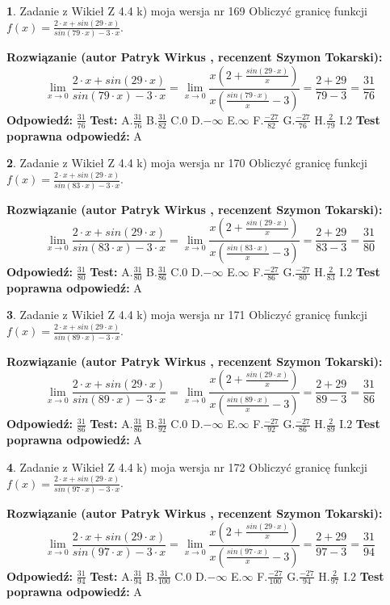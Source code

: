 \documentclass[12pt, a4paper]{article}
\theoremstyle{definition} %
\newtheorem{zad}{}
\newcommand{\zadStart}[1]{\begin{zad}#1\newline}
\newcommand{\zadStop}{\end{zad}}
\newcommand{\rozwStart}[2]{\noindent \textbf{Rozwiązanie (autor #1 , recenzent #2): }\newline}
\newcommand{\rozwStop}{\newline}
\newcommand{\odpStart}{\noindent \textbf{Odpowiedź:}\newline}
\newcommand{\odpStop}{\newline}
\newcommand{\testStart}{\noindent \textbf{Test:}\newline}
\newcommand{\testStop}{\newline}
\newcommand{\kluczStart}{\noindent \textbf{Test poprawna odpowiedź:}\newline}
\newcommand{\kluczStop}{\newline}
\begin{document}
\zadStart{Zadanie z Wikieł Z 4.4 k) moja wersja nr 169}
Obliczyć granicę funkcji $f(x)=\frac{2\cdot x +sin(29\cdot x)}{sin(79\cdot x) -3\cdot x}$.
\zadStop
\rozwStart{Patryk Wirkus}{Szymon Tokarski}
$$\lim\limits_{x\to 0}\frac{2\cdot x +sin(29\cdot x)}{sin(79\cdot x) -3\cdot x}
=\lim\limits_{x\to 0}\frac{x(2+\frac{sin(29\cdot x)}{x})}{x(\frac{sin(79\cdot x)}{x}-3)}
=\frac{2+29}{79-3} = \frac{31}{76}$$
\rozwStop
\odpStart
$\frac{31}{76}$
\odpStop
\testStart
A.$\frac{31}{76}$
B.$\frac{31}{82}$
C.$0$
D.$-\infty$
E.$\infty$
F.$\frac{-27}{82}$
G.$\frac{-27}{76}$
H.$\frac{2}{79}$
I.$2$
\testStop
\kluczStart
A
\kluczStop



\zadStart{Zadanie z Wikieł Z 4.4 k) moja wersja nr 170}
Obliczyć granicę funkcji $f(x)=\frac{2\cdot x +sin(29\cdot x)}{sin(83\cdot x) -3\cdot x}$.
\zadStop
\rozwStart{Patryk Wirkus}{Szymon Tokarski}
$$\lim\limits_{x\to 0}\frac{2\cdot x +sin(29\cdot x)}{sin(83\cdot x) -3\cdot x}
=\lim\limits_{x\to 0}\frac{x(2+\frac{sin(29\cdot x)}{x})}{x(\frac{sin(83\cdot x)}{x}-3)}
=\frac{2+29}{83-3} = \frac{31}{80}$$
\rozwStop
\odpStart
$\frac{31}{80}$
\odpStop
\testStart
A.$\frac{31}{80}$
B.$\frac{31}{86}$
C.$0$
D.$-\infty$
E.$\infty$
F.$\frac{-27}{86}$
G.$\frac{-27}{80}$
H.$\frac{2}{83}$
I.$2$
\testStop
\kluczStart
A
\kluczStop



\zadStart{Zadanie z Wikieł Z 4.4 k) moja wersja nr 171}
Obliczyć granicę funkcji $f(x)=\frac{2\cdot x +sin(29\cdot x)}{sin(89\cdot x) -3\cdot x}$.
\zadStop
\rozwStart{Patryk Wirkus}{Szymon Tokarski}
$$\lim\limits_{x\to 0}\frac{2\cdot x +sin(29\cdot x)}{sin(89\cdot x) -3\cdot x}
=\lim\limits_{x\to 0}\frac{x(2+\frac{sin(29\cdot x)}{x})}{x(\frac{sin(89\cdot x)}{x}-3)}
=\frac{2+29}{89-3} = \frac{31}{86}$$
\rozwStop
\odpStart
$\frac{31}{86}$
\odpStop
\testStart
A.$\frac{31}{86}$
B.$\frac{31}{92}$
C.$0$
D.$-\infty$
E.$\infty$
F.$\frac{-27}{92}$
G.$\frac{-27}{86}$
H.$\frac{2}{89}$
I.$2$
\testStop
\kluczStart
A
\kluczStop



\zadStart{Zadanie z Wikieł Z 4.4 k) moja wersja nr 172}
Obliczyć granicę funkcji $f(x)=\frac{2\cdot x +sin(29\cdot x)}{sin(97\cdot x) -3\cdot x}$.
\zadStop
\rozwStart{Patryk Wirkus}{Szymon Tokarski}
$$\lim\limits_{x\to 0}\frac{2\cdot x +sin(29\cdot x)}{sin(97\cdot x) -3\cdot x}
=\lim\limits_{x\to 0}\frac{x(2+\frac{sin(29\cdot x)}{x})}{x(\frac{sin(97\cdot x)}{x}-3)}
=\frac{2+29}{97-3} = \frac{31}{94}$$
\rozwStop
\odpStart
$\frac{31}{94}$
\odpStop
\testStart
A.$\frac{31}{94}$
B.$\frac{31}{100}$
C.$0$
D.$-\infty$
E.$\infty$
F.$\frac{-27}{100}$
G.$\frac{-27}{94}$
H.$\frac{2}{97}$
I.$2$
\testStop
\kluczStart
A
\kluczStop
\end{document}
